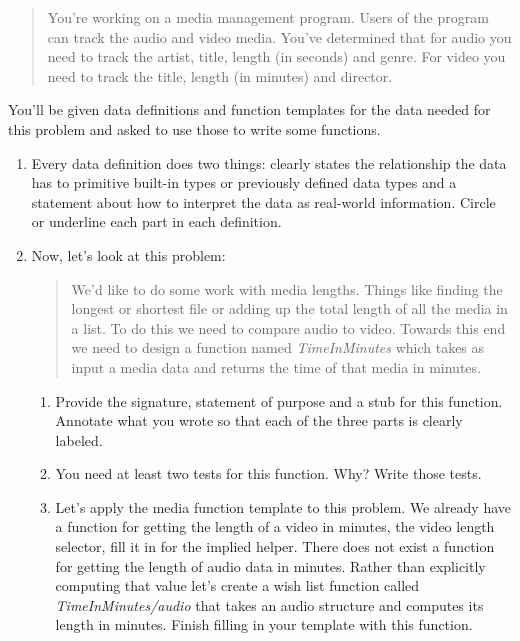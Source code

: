 \documentclass{article}
\begin{document}
\begin{quote}
You're working on a media management program. Users of the program can track the audio and video media.  You've determined that for audio you need to track the artist, title, length (in seconds) and genre. For video you need to track the title, length (in minutes) and director.
\end{quote}

You'll be given data definitions and function templates for the data needed for this problem and asked to use those to write some functions.

\newpage \thispagestyle{empty}

\begin{enumerate}
  \item Every data definition does two things: clearly states the relationship the data has to primitive built-in types or previously defined data types and a statement about how to interpret the data as real-world information. Circle or underline each part in each definition.

  \item Now, let's look at this problem:
  \begin{quote}
    We'd like to do some work with media lengths. Things like finding the longest or shortest file or adding up the total length of all the media in a list. To do this we need to compare audio to video. Towards this end we need to design a function named \textit{TimeInMinutes} which takes as input a media data and returns the time of that media in minutes.
  \end{quote}
  \begin{enumerate}
    \item Provide the signature, statement of purpose and a stub for this function. Annotate what you wrote so that each of the three parts is clearly labeled.

    \vspace{4in}

    \item You need at least two tests for this function. Why? Write those tests.

    \newpage \thispagestyle{empty}

    \item Let's apply the media function template to this problem. We already have a function for getting the length of a video in minutes, the video length selector, fill it in for the implied helper. There does not exist a function for getting the length of audio data in minutes. Rather than explicitly computing that value let's create a wish list function called \textit{TimeInMinutes/audio} that takes an audio structure and computes its length in minutes. Finish filling in your template with this function.


\end{enumerate}
\end{enumerate}
\end{document}
